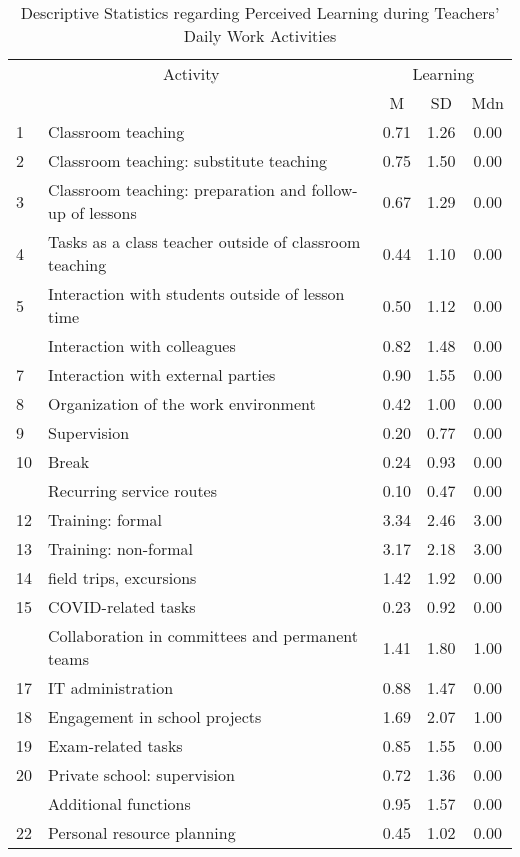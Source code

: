 \documentclass[
]{article}
\begin{document}
\begin{longtable}[t]{llccc}
\caption{\label{tab:rq1b only pc_learn}Descriptive Statistics regarding Perceived Learning during Teachers' Daily Work Activities}\\
\toprule
\multicolumn{2}{c}{Activity} & \multicolumn{3}{c}{Learning} \\
\cmidrule(l{3pt}r{3pt}){1-2} \cmidrule(l{3pt}r{3pt}){3-5}
 &  & M & SD & Mdn\\
\midrule
1 & Classroom teaching & 0.71 & 1.26 & 0.00\\
2 & Classroom teaching: substitute teaching & 0.75 & 1.50 & 0.00\\
3 & Classroom teaching: preparation and follow-up of lessons & 0.67 & 1.29 & 0.00\\
4 & Tasks as a class teacher outside of classroom teaching & 0.44 & 1.10 & 0.00\\
5 & Interaction with students outside of lesson time & 0.50 & 1.12 & 0.00\\
\addlinespace
6 & Interaction with colleagues & 0.82 & 1.48 & 0.00\\
7 & Interaction with external parties & 0.90 & 1.55 & 0.00\\
8 & Organization of the work environment & 0.42 & 1.00 & 0.00\\
9 & Supervision & 0.20 & 0.77 & 0.00\\
10 & Break & 0.24 & 0.93 & 0.00\\
\addlinespace
11 & Recurring service routes & 0.10 & 0.47 & 0.00\\
12 & Training: formal & 3.34 & 2.46 & 3.00\\
13 & Training: non-formal & 3.17 & 2.18 & 3.00\\
14 & field trips, excursions & 1.42 & 1.92 & 0.00\\
15 & COVID-related tasks & 0.23 & 0.92 & 0.00\\
\addlinespace
16 & Collaboration in committees and permanent teams & 1.41 & 1.80 & 1.00\\
17 & IT administration & 0.88 & 1.47 & 0.00\\
18 & Engagement in school projects & 1.69 & 2.07 & 1.00\\
19 & Exam-related tasks & 0.85 & 1.55 & 0.00\\
20 & Private school: supervision & 0.72 & 1.36 & 0.00\\
\addlinespace
21 & Additional functions & 0.95 & 1.57 & 0.00\\
22 & Personal resource planning & 0.45 & 1.02 & 0.00\\

\end{longtable}
\end{document}

